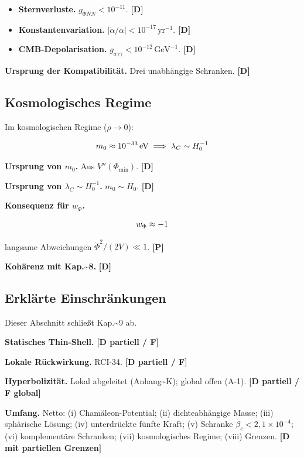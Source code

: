 ﻿\documentclass[11pt,letterpaper]{article}
\begin{document}
\begin{itemize}[leftmargin=*]
\item \textbf{Sternverluste.} $g_{\Phi NN} < 10^{-11}$. \textbf{[D]}
\item \textbf{Konstantenvariation.} $|\dot\alpha/\alpha| < 10^{-17}\,\text{yr}^{-1}$. \textbf{[D]}
\item \textbf{CMB-Depolarisation.} $g_{a\gamma\gamma} < 10^{-12}\,\text{GeV}^{-1}$. \textbf{[D]}
\end{itemize}

\textbf{Ursprung der Kompatibilität.} Drei unabhängige Schranken. \textbf{[D]}
\subsection{Kosmologisches Regime}
Im kosmologischen Regime ($\rho \to 0$):

\begin{equation*}
  \resizebox{\ifdim\width>\linewidth \linewidth\else\width\fi}{!}{$\displaystyle m_0 \approx 10^{-33}\,\text{eV} \implies \lambda_C \sim H_0^{-1}$}
\end{equation*}

\textbf{Ursprung von $m_0$.} Aus $V''(\Phi_{\text{min}})$. \textbf{[D]}

\textbf{Ursprung von $\lambda_C \sim H_0^{-1}$.} $m_0 \sim H_0$. \textbf{[D]}

\textbf{Konsequenz für $w_\Phi$.}

\begin{equation*}
  \resizebox{\ifdim\width>\linewidth \linewidth\else\width\fi}{!}{$\displaystyle w_\Phi \approx -1$}
\end{equation*}

langsame Abweichungen $\dot\Phi^2/(2V) \ll 1$. \textbf{[P]}

\textbf{Kohärenz mit Kap.\textasciitilde{}8.} \textbf{[D]}
\subsection{Erklärte Einschränkungen}
Dieser Abschnitt schließt Kap.\textasciitilde{}9 ab.

\textbf{Statisches Thin-Shell.} \textbf{[D partiell / F]}

\textbf{Lokale Rückwirkung.} RCI-34. \textbf{[D partiell / F]}

\textbf{Hyperbolizität.} Lokal abgeleitet (Anhang\textasciitilde{}K); global offen (A-1). \textbf{[D partiell / F global]}

\textbf{Umfang.} Netto: (i) Chamäleon-Potential; (ii) dichteabhängige Masse; (iii) sphärische Lösung; (iv) unterdrückte fünfte Kraft; (v) Schranke $\beta_c < 2{,}1 \times 10^{-4}$; (vi) komplementäre Schranken; (vii) kosmologisches Regime; (viii) Grenzen. \textbf{[D mit partiellen Grenzen]}
\end{document}
